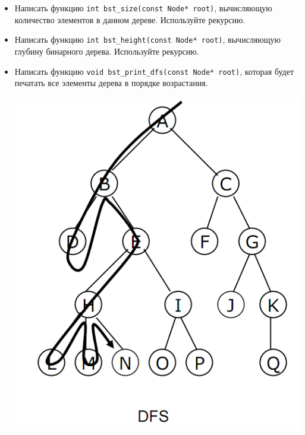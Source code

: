 \documentclass{article}
\begin{document}
\begin{itemize}
\item Написать функцию \texttt{int bst\_size(const Node* root)}, вычисляющую количество элементов в данном дереве. Используйте рекурсию.
\item Написать функцию \texttt{int bst\_height(const Node* root)}, вычисляющую глубину бинарного дерева. Используйте рекурсию.
\item Написать функцию \texttt{void bst\_print\_dfs(const Node* root)}, которая будет печатать все элементы дерева в порядке возрастания.
\begin{multicols}{2}
\noindent
\begin{center}
\includegraphics[scale=0.24]{../images/dfs.png}
\end{center}
\columnbreak
\begin{center}

\end{center}
\end{multicols}
\end{itemize}
\end{document}
